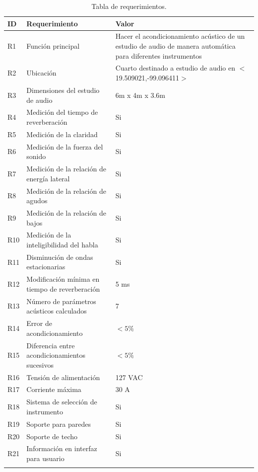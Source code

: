 \begin{center}
\footnotesize
    \begin{longtable}[!htb]{| m{3em} | m{15em} | m{10em}|}
    \hline
    \textbf{ID}& \textbf{Requerimiento} & \textbf{Valor}\\
    \hline\hline
    R1 & Función principal & Hacer el acondicionamiento acústico de un estudio de audio de manera automática para diferentes instrumentos\\
    \hline
    R2 & Ubicación & Cuarto destinado a estudio de audio en $<$19.509021,-99.096411$>$\\
    \hline
    R3 & Dimensiones del estudio de audio & 6m x 4m x 3.6m\\
    \hline
    R4 & Medición del tiempo de reverberación & Si\\
    \hline
    R5 & Medición de la claridad & Si\\
    \hline
    R6 & Medición de la fuerza del sonido & Si\\
    \hline
    R7 & Medición de la relación de energía lateral & Si\\
    \hline
    R8 & Medición de la relación de agudos & Si\\
    \hline
    R9 & Medición de la relación de bajos & Si\\
    \hline
    R10 & Medición de la inteligibilidad del habla & Si\\
    \hline
    R11 & Disminución de ondas estacionarias & Si \\
    \hline
    R12 & Modificación mínima en tiempo de reverberación & 5 ms\\
    \hline
    R13 & Número de parámetros acústicos calculados & 7\\
    \hline
    R14 & Error de acondicionamiento & $<5\%$\\
    \hline
    R15 & Diferencia entre acondicionamientos sucesivos & $<5\%$\\
    \hline
    R16 & Tensión de alimentación & 127 VAC\\
    \hline
    R17 & Corriente máxima & 30 A \\
    \hline
    R18 & Sistema de selección de instrumento & Si\\
    \hline
    R19 & Soporte para paredes & Si\\
    \hline
    R20 & Soporte de techo & Si \\
    \hline
    R21 & Información en interfaz para usuario & Si\\
    \hline

    \caption{Tabla de requerimientos.}
    \label{tab:Requerimientos}
    \end{longtable}
\end{center}

